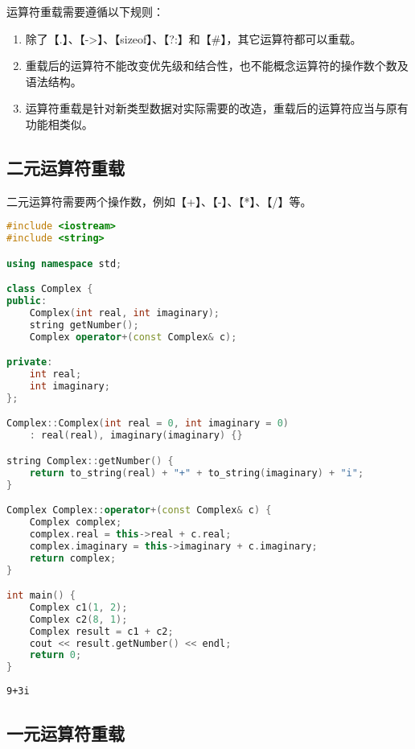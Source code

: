 运算符重载需要遵循以下规则：

\begin{enumerate}
	\item 除了【.】、【->】、【sizeof】、【?:】和【\#】，其它运算符都可以重载。
	\item 重载后的运算符不能改变优先级和结合性，也不能概念运算符的操作数个数及语法结构。
	\item 运算符重载是针对新类型数据对实际需要的改造，重载后的运算符应当与原有功能相类似。
\end{enumerate}

\subsection{二元运算符重载}

二元运算符需要两个操作数，例如【+】、【-】、【*】、【/】等。 \\


\begin{lstlisting}[language=C++]
#include <iostream>
#include <string>

using namespace std;

class Complex {
public:
    Complex(int real, int imaginary);
    string getNumber();
    Complex operator+(const Complex& c);

private:
    int real;
    int imaginary;
};

Complex::Complex(int real = 0, int imaginary = 0)
    : real(real), imaginary(imaginary) {}

string Complex::getNumber() {
    return to_string(real) + "+" + to_string(imaginary) + "i";
}

Complex Complex::operator+(const Complex& c) {
    Complex complex;
    complex.real = this->real + c.real;
    complex.imaginary = this->imaginary + c.imaginary;
    return complex;
}

int main() {
    Complex c1(1, 2);
    Complex c2(8, 1);
    Complex result = c1 + c2;
    cout << result.getNumber() << endl;
    return 0;
}
\end{lstlisting}

\begin{tcolorbox}
	\begin{verbatim}
9+3i
	\end{verbatim}
\end{tcolorbox}

\subsection{一元运算符重载}

